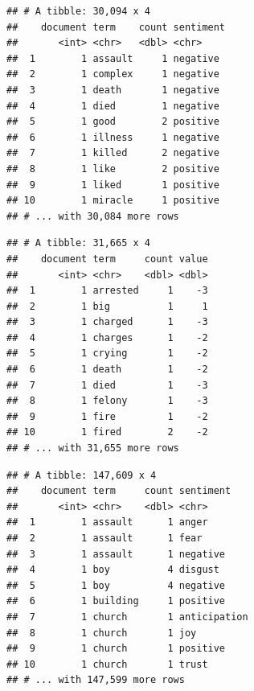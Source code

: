 \documentclass[]{article}
\newenvironment{Shaded}{\begin{snugshade}}{\end{snugshade}}
\newcommand{\DataTypeTok}[1]{\textcolor[rgb]{0.13,0.29,0.53}{#1}}
\newcommand{\KeywordTok}[1]{\textcolor[rgb]{0.13,0.29,0.53}{\textbf{#1}}}
\newcommand{\NormalTok}[1]{#1}
\newcommand{\OperatorTok}[1]{\textcolor[rgb]{0.81,0.36,0.00}{\textbf{#1}}}
\newcommand{\StringTok}[1]{\textcolor[rgb]{0.31,0.60,0.02}{#1}}
\begin{document}
\begin{verbatim}
## # A tibble: 30,094 x 4
##    document term    count sentiment
##       <int> <chr>   <dbl> <chr>    
##  1        1 assault     1 negative 
##  2        1 complex     1 negative 
##  3        1 death       1 negative 
##  4        1 died        1 negative 
##  5        1 good        2 positive 
##  6        1 illness     1 negative 
##  7        1 killed      2 negative 
##  8        1 like        2 positive 
##  9        1 liked       1 positive 
## 10        1 miracle     1 positive 
## # ... with 30,084 more rows
\end{verbatim}

\begin{Shaded}
\end{Shaded}

\begin{verbatim}
## # A tibble: 31,665 x 4
##    document term     count value
##       <int> <chr>    <dbl> <dbl>
##  1        1 arrested     1    -3
##  2        1 big          1     1
##  3        1 charged      1    -3
##  4        1 charges      1    -2
##  5        1 crying       1    -2
##  6        1 death        1    -2
##  7        1 died         1    -3
##  8        1 felony       1    -3
##  9        1 fire         1    -2
## 10        1 fired        2    -2
## # ... with 31,655 more rows
\end{verbatim}

\begin{Shaded}
\end{Shaded}

\begin{verbatim}
## # A tibble: 147,609 x 4
##    document term     count sentiment   
##       <int> <chr>    <dbl> <chr>       
##  1        1 assault      1 anger       
##  2        1 assault      1 fear        
##  3        1 assault      1 negative    
##  4        1 boy          4 disgust     
##  5        1 boy          4 negative    
##  6        1 building     1 positive    
##  7        1 church       1 anticipation
##  8        1 church       1 joy         
##  9        1 church       1 positive    
## 10        1 church       1 trust       
## # ... with 147,599 more rows
\end{verbatim}
\end{document}
